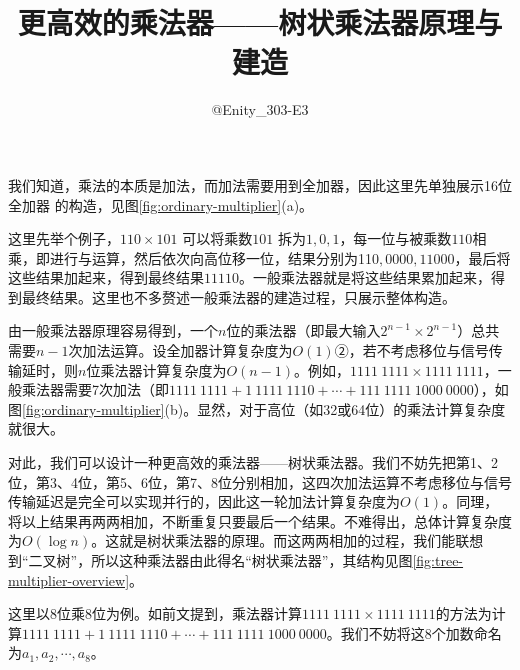 \documentclass[UTF8,12pt,punct=kaiming,fontset=none]{ctexart}
\title{\vspace{-1.5cm}更高效的乘法器——树状乘法器原理与建造\vspace{-0.5cm}}
\author{@Enity\_303-E3}
\date{}
\newcommand*{\upcite}[1]{
    \textsuperscript{\cite{#1}}
}
\begin{document}
\hypersetup{bookmarksdepth=-1}  %
\maketitle
\thispagestyle{fancy}  %
\vspace{-0.7cm}

\titleformat{\section}[hang]{\large\sffamily\bfseries}{\textmd{\thesection}}{0.5cm}{}
\titlespacing{\section}{0cm}{0.5ex}{0.2ex}
\setcounter{section}{0}

我们知道，乘法的本质是加法，而加法需要用到全加器，因此这里先单独展示16位全加器\upcite{full_adder}的构造，见图\ref{fig:ordinary-multiplier}(a)。

这里先举个例子，$110\times101$ 可以将乘数$101$ 拆为$1,0,1$，每一位与被乘数$110$相乘，即进行与运算，然后依次向高位移一位，结果分别为11$0,0000,11000$，最后将这些结果加起来，得到最终结果$11110$。一般乘法器就是将这些结果累加起来，得到最终结果。这里也不多赘述一般乘法器的建造过程，只展示整体构造。

由一般乘法器原理容易得到，一个$n$位的乘法器（即最大输入$2^{n-1}\times2^{n-1}$）总共需要$n-1$次加法运算。设全加器计算复杂度为$O(1)$②，若不考虑移位与信号传输延时，则$n$位乘法器计算复杂度为$O(n-1)$。例如，$1111\ 1111\times1111\ 1111$，一般乘法器需要7次加法（即$1111\ 1111+1\ 1111\ 1110+\cdots+111\ 1111\ 1000\ 0000$），如图\ref{fig:ordinary-multiplier}(b)。显然，对于高位（如32或64位）的乘法计算复杂度就很大。

对此，我们可以设计一种更高效的乘法器——树状乘法器。我们不妨先把第1、2位，第3、4位，第5、6位，第7、8位分别相加，这四次加法运算不考虑移位与信号传输延迟是完全可以实现并行的，因此这一轮加法计算复杂度为$O(1)$。同理，将以上结果再两两相加，不断重复只要最后一个结果。不难得出，总体计算复杂度为$O(\log n)$。这就是树状乘法器的原理。而这两两相加的过程，我们能联想到“二叉树”，所以这种乘法器由此得名“树状乘法器”，其结构见图\ref{fig:tree-multiplier-overview}。

这里以8位乘8位为例。如前文提到，乘法器计算$1111\ 1111\times1111\ 1111$的方法为计算$1111\ 1111+1\ 1111\ 1110+\cdots+111\ 1111\ 1000\ 0000$。我们不妨将这8个加数命名为$a_1,a_2,\cdots,a_8$。
\end{document}
